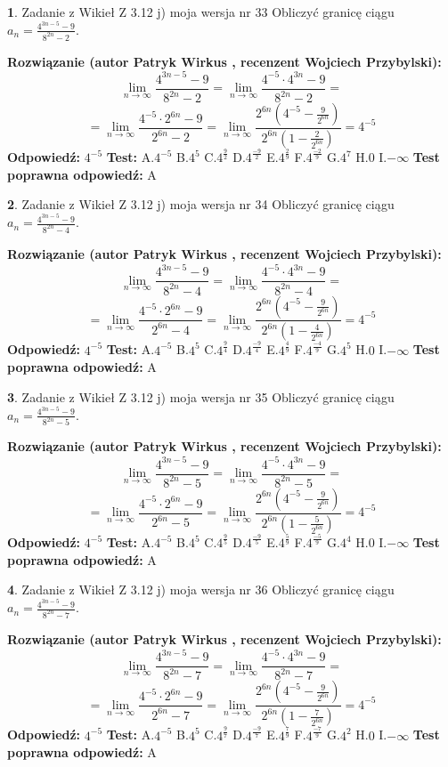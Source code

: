 \documentclass[12pt, a4paper]{article}
\theoremstyle{definition} %
\newtheorem{zad}{}
\newcommand{\zadStart}[1]{\begin{zad}#1\newline}
\newcommand{\zadStop}{\end{zad}}
\newcommand{\rozwStart}[2]{\noindent \textbf{Rozwiązanie (autor #1 , recenzent #2): }\newline}
\newcommand{\rozwStop}{\newline}
\newcommand{\odpStart}{\noindent \textbf{Odpowiedź:}\newline}
\newcommand{\odpStop}{\newline}
\newcommand{\testStart}{\noindent \textbf{Test:}\newline}
\newcommand{\testStop}{\newline}
\newcommand{\kluczStart}{\noindent \textbf{Test poprawna odpowiedź:}\newline}
\newcommand{\kluczStop}{\newline}
\begin{document}
\zadStart{Zadanie z Wikieł Z 3.12 j) moja wersja nr 33}
Obliczyć granicę ciągu $a_{n}=\frac{4^{3n-5}-9}{8^{2n}-2}$.
\zadStop
\rozwStart{Patryk Wirkus}{Wojciech Przybylski}
$$\lim\limits_{n\to\infty}\frac{4^{3n-5}-9}{8^{2n}-2}= \lim\limits_{n\to\infty}\frac{4^{-5} \cdot 4^{3n}-9}{8^{2n}-2}=$$
$$= \lim\limits_{n\to\infty}\frac{4^{-5} \cdot 2^{6n}-9}{2^{6n}-2}= \lim\limits_{n\to\infty}\frac{2^{6n}(4^{-5} - \frac{9}{2^{6n}})}{2^{6n}(1-\frac{2}{2^{6n}})}= 4^{-5}$$
\rozwStop
\odpStart
$4^{-5}$
\odpStop
\testStart
A.$4^{-5}$
B.$4^{5}$
C.$4^{\frac{9}{2}}$
D.$4^{\frac{-9}{2}}$
E.$4^{\frac{2}{9}}$
F.$4^{\frac{-2}{9}}$
G.$4^{7}$
H.$0$
I.$-\infty$
\testStop
\kluczStart
A
\kluczStop



\zadStart{Zadanie z Wikieł Z 3.12 j) moja wersja nr 34}
Obliczyć granicę ciągu $a_{n}=\frac{4^{3n-5}-9}{8^{2n}-4}$.
\zadStop
\rozwStart{Patryk Wirkus}{Wojciech Przybylski}
$$\lim\limits_{n\to\infty}\frac{4^{3n-5}-9}{8^{2n}-4}= \lim\limits_{n\to\infty}\frac{4^{-5} \cdot 4^{3n}-9}{8^{2n}-4}=$$
$$= \lim\limits_{n\to\infty}\frac{4^{-5} \cdot 2^{6n}-9}{2^{6n}-4}= \lim\limits_{n\to\infty}\frac{2^{6n}(4^{-5} - \frac{9}{2^{6n}})}{2^{6n}(1-\frac{4}{2^{6n}})}= 4^{-5}$$
\rozwStop
\odpStart
$4^{-5}$
\odpStop
\testStart
A.$4^{-5}$
B.$4^{5}$
C.$4^{\frac{9}{4}}$
D.$4^{\frac{-9}{4}}$
E.$4^{\frac{4}{9}}$
F.$4^{\frac{-4}{9}}$
G.$4^{5}$
H.$0$
I.$-\infty$
\testStop
\kluczStart
A
\kluczStop



\zadStart{Zadanie z Wikieł Z 3.12 j) moja wersja nr 35}
Obliczyć granicę ciągu $a_{n}=\frac{4^{3n-5}-9}{8^{2n}-5}$.
\zadStop
\rozwStart{Patryk Wirkus}{Wojciech Przybylski}
$$\lim\limits_{n\to\infty}\frac{4^{3n-5}-9}{8^{2n}-5}= \lim\limits_{n\to\infty}\frac{4^{-5} \cdot 4^{3n}-9}{8^{2n}-5}=$$
$$= \lim\limits_{n\to\infty}\frac{4^{-5} \cdot 2^{6n}-9}{2^{6n}-5}= \lim\limits_{n\to\infty}\frac{2^{6n}(4^{-5} - \frac{9}{2^{6n}})}{2^{6n}(1-\frac{5}{2^{6n}})}= 4^{-5}$$
\rozwStop
\odpStart
$4^{-5}$
\odpStop
\testStart
A.$4^{-5}$
B.$4^{5}$
C.$4^{\frac{9}{5}}$
D.$4^{\frac{-9}{5}}$
E.$4^{\frac{5}{9}}$
F.$4^{\frac{-5}{9}}$
G.$4^{4}$
H.$0$
I.$-\infty$
\testStop
\kluczStart
A
\kluczStop



\zadStart{Zadanie z Wikieł Z 3.12 j) moja wersja nr 36}
Obliczyć granicę ciągu $a_{n}=\frac{4^{3n-5}-9}{8^{2n}-7}$.
\zadStop
\rozwStart{Patryk Wirkus}{Wojciech Przybylski}
$$\lim\limits_{n\to\infty}\frac{4^{3n-5}-9}{8^{2n}-7}= \lim\limits_{n\to\infty}\frac{4^{-5} \cdot 4^{3n}-9}{8^{2n}-7}=$$
$$= \lim\limits_{n\to\infty}\frac{4^{-5} \cdot 2^{6n}-9}{2^{6n}-7}= \lim\limits_{n\to\infty}\frac{2^{6n}(4^{-5} - \frac{9}{2^{6n}})}{2^{6n}(1-\frac{7}{2^{6n}})}= 4^{-5}$$
\rozwStop
\odpStart
$4^{-5}$
\odpStop
\testStart
A.$4^{-5}$
B.$4^{5}$
C.$4^{\frac{9}{7}}$
D.$4^{\frac{-9}{7}}$
E.$4^{\frac{7}{9}}$
F.$4^{\frac{-7}{9}}$
G.$4^{2}$
H.$0$
I.$-\infty$
\testStop
\kluczStart
A
\kluczStop
\end{document}
